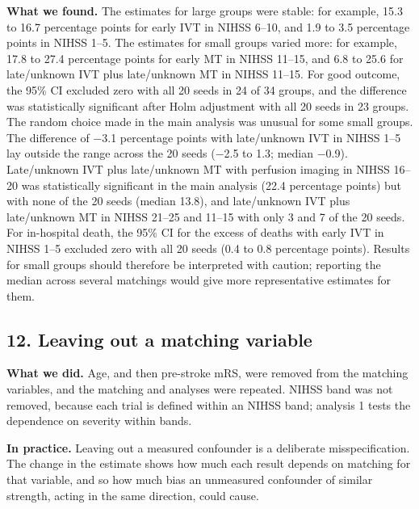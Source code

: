\textbf{What we found.} The estimates for large groups were stable: for example, 15.3 to 16.7 percentage points for early IVT in NIHSS 6--10, and 1.9 to 3.5 percentage points in NIHSS 1--5. The estimates for small groups varied more: for example, 17.8 to 27.4 percentage points for early MT in NIHSS 11--15, and 6.8 to 25.6 for late/unknown IVT plus late/unknown MT in NIHSS 11--15. For good outcome, the 95\% CI excluded zero with all 20 seeds in 24 of 34 groups, and the difference was statistically significant after Holm adjustment with all 20 seeds in 23 groups. The random choice made in the main analysis was unusual for some small groups. The difference of $-$3.1 percentage points with late/unknown IVT in NIHSS 1--5 lay outside the range across the 20 seeds ($-$2.5 to 1.3; median $-$0.9). Late/unknown IVT plus late/unknown MT with perfusion imaging in NIHSS 16--20 was statistically significant in the main analysis (22.4 percentage points) but with none of the 20 seeds (median 13.8), and late/unknown IVT plus late/unknown MT in NIHSS 21--25 and 11--15 with only 3 and 7 of the 20 seeds. For in-hospital death, the 95\% CI for the excess of deaths with early IVT in NIHSS 1--5 excluded zero with all 20 seeds (0.4 to 0.8 percentage points). Results for small groups should therefore be interpreted with caution; reporting the median across several matchings would give more representative estimates for them.

\subsection*{12. Leaving out a matching variable}

\textbf{What we did.} Age, and then pre-stroke mRS, were removed from the matching variables, and the matching and analyses were repeated. NIHSS band was not removed, because each trial is defined within an NIHSS band; analysis 1 tests the dependence on severity within bands.

\textbf{In practice.} Leaving out a measured confounder is a deliberate misspecification. The change in the estimate shows how much each result depends on matching for that variable, and so how much bias an unmeasured confounder of similar strength, acting in the same direction, could cause.


